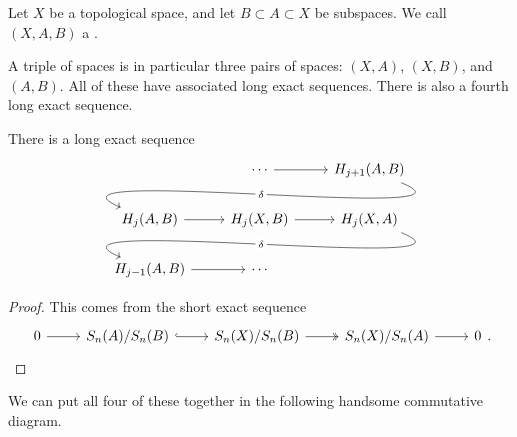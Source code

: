 \documentclass[main.tex]{subfiles}
\begin{document}
\begin{definition}
  \label{def:triple_of_spaces}
  Let $X$ be a topological space, and let $B \subset A \subset X$ be subspaces. We call $(X, A, B)$ a .
\end{definition}

A triple of spaces is in particular three pairs of spaces: $(X, A)$, $(X, B)$, and $(A, B)$. All of these have associated long exact sequences. There is also a fourth long exact sequence.

\begin{proposition}
  \label{prop:long_exact_sequence_on_triple}
  There is a long exact sequence
  \begin{equation*}
    \begin{tikzcd}
      & \cdots
      \arrow[r]
      & H_{j+1}(A, B)
      \\
      H_{j}(A, B)
      \arrow[from=urr, out=-22, in=157, looseness=1, overlay, "\delta" description]
      \arrow[r,]
      & H_{j}(X, B)
      \arrow[r,]
      & H_{j}(X, A)
      \\
      H_{j-1}(A, B)
      \arrow[r]
      \arrow[from=urr, out=-22, in=157, looseness=1, overlay, "\delta" description]
      & \cdots
    \end{tikzcd}
  \end{equation*}
\end{proposition}
\begin{proof}
  This comes from the short exact sequence
  \begin{equation*}
    \begin{tikzcd}
      0
      \arrow[r]
      & S_{n}(A)/S_{n}(B)
      \arrow[r, hook]
      & S_{n}(X)/S_{n}(B)
      \arrow[r, two heads]
      & S_{n}(X)/S_{n}(A)
      \arrow[r]
      & 0
    \end{tikzcd}.
  \end{equation*}
\end{proof}

We can put all four of these together in the following handsome commutative diagram.
\end{document}
